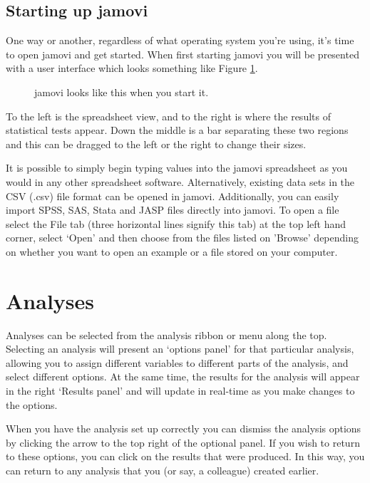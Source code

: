 \subsection{Starting up jamovi}

One way or another, regardless of what operating system you're using, it's time to open jamovi and get started. When first starting jamovi you will be presented with a user interface which looks something like Figure \ref{fig:startingjamovi}.

\begin{figure}[ht]
\begin{center}
\caption{jamovi looks like this when you start it.}
\label{fig:startingjamovi}
\end{center}
\end{figure}

To the left is the spreadsheet view, and to the right is where the results of statistical tests appear. Down the middle is a bar separating these two regions and this can be dragged to the left or the right to change their sizes. 

It is possible to simply begin typing values into the jamovi spreadsheet as you would in any other spreadsheet software. Alternatively, existing data sets in the CSV (.csv) file format can be opened in jamovi. Additionally, you can easily import SPSS, SAS, Stata and JASP files directly into jamovi. To open a file select the File tab (three horizontal lines signify this tab) at the top left hand corner, select ‘Open’ and then choose from the files listed on 'Browse' depending on whether you want to open an example or a file stored on your computer.


\section{Analyses\label{sec:analyses}}

Analyses can be selected from the analysis ribbon or menu along the top. Selecting an analysis will present an ‘options panel’ for that particular analysis, allowing you to assign different variables to different parts of the analysis, and select different options. At the same time, the results for the analysis will appear in the right ‘Results panel’ and will update in real-time as you make changes to the options.

When you have the analysis set up correctly you can dismiss the analysis options by clicking the arrow to the top right of the optional panel. If you wish to return to these options, you can click on the results that were produced. In this way, you can return to any analysis that you (or say, a colleague) created earlier.

